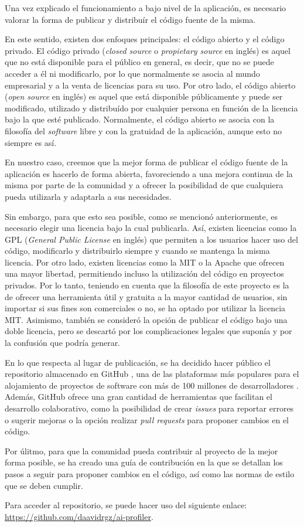 Una vez explicado el funcionamiento a bajo nivel de la aplicación, es necesario valorar la forma de publicar y
distribuír el código fuente de la misma.

\bigskip
En este sentido, existen dos enfoques principales: el código abierto y el código privado.
El código privado (\textit{closed source} o \textit{propietary source} en inglés) es aquel que no está disponible para el público en general, es decir, que no se puede acceder a él ni
modificarlo, por lo que normalmente se asocia al mundo empresarial y a la venta de licencias para su uso.
Por otro lado, el código abierto (\textit{open source} en inglés) es aquel que
está disponible públicamente y puede ser modificado, utilizado y distribuído por cualquier persona en función
de la licencia bajo la que esté publicado. Normalmente, el código abierto se asocia con la filosofía del \textit{software} libre
y con la gratuidad de la aplicación, aunque esto no siempre es así.

\bigskip
En nuestro caso, creemos que la mejor forma de publicar el código fuente de la aplicación es hacerlo de forma abierta,
favoreciendo a una mejora continua de la misma por parte de la comunidad y a ofrecer la posibilidad de que cualquiera pueda
utilizarla y adaptarla a sus necesidades.

\bigskip
Sin embargo, para que esto sea posible, como se mencionó anteriormente, es necesario elegir una licencia bajo la cual publicarla. Así, existen licencias
como la GPL (\textit{General Public License} en inglés) \cite{gpl} que permiten a los usuarios hacer uso del código, modificarlo y distribuirlo
siempre y cuando se mantenga la misma licencia. Por otro lado, existen licencias como la MIT \cite{mitlicense} o la Apache \cite{apachelicense} que ofrecen una mayor libertad,
permitiendo incluso la utilización del código en proyectos privados. Por lo tanto, teniendo en cuenta que la filosofía de este proyecto es la de ofrecer una herramienta útil y gratuita a la mayor
cantidad de usuarios, sin importar si sus fines son comerciales o no, se ha optado por utilizar la licencia MIT. Asimismo, también se consideró la opción de publicar el código
bajo una doble licencia, pero se descartó por los complicaciones legales que suponía y por la confusión que podría generar.

\bigskip
En lo que respecta al lugar de publicación, se ha decidido hacer público el repositorio almacenado en GitHub \cite{github}, una de las
plataformas más populares para el alojamiento de proyectos de software con más de 100 millones de desarrolladores \cite{100milliongithub}.
Además, GitHub ofrece una gran cantidad de herramientas que facilitan el desarrollo colaborativo, como la posibilidad de crear \textit{issues} para
reportar errores o sugerir mejoras o la opción realizar \textit{pull requests} para proponer cambios en el código.

\bigskip
Por úlitmo, para que la comunidad pueda contribuir al proyecto de la mejor forma posible, se ha creado una guía de contribución
en la que se detallan los pasos a seguir para proponer cambios en el código, así como las normas de estilo que se deben cumplir.

\bigskip
Para acceder al repositorio, se puede hacer uso del siguiente enlace: \url{https://github.com/daavidrgz/ai-profiler}.
